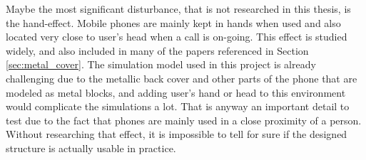 Maybe the most significant disturbance, that is not researched in this thesis, is the hand-effect. Mobile phones are mainly kept in hands when used and also located very close to user's head when a call is on-going. This effect is studied widely, and also included in many of the papers referenced in Section \ref{sec:metal_cover}. The simulation model used in this project is already challenging due to the metallic back cover and other parts of the phone that are modeled as metal blocks, and adding user's hand or head to this environment would complicate the simulations a lot. That is anyway an important detail to test due to the fact that phones are mainly used in a close proximity of a person. Without researching that effect, it is impossible to tell for sure if the designed structure is actually usable in practice.


\clearpage